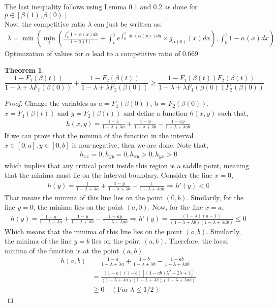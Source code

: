 \documentclass[10pt, letterpaper, twoside]{article}
\newtheorem{theorem}{Theorem}
\begin{document}
	The last inequality follows using Lemma 0.1 and 0.2 as done for $p \in [\beta(1),\beta(0)]$\\
	Now, the competitive ratio $\lambda$ can just be written as:
	\begin{align*}
	\lambda = \min \left(\min_{t}\left(\frac{\int_{0}^{t} 1 - \alpha(x) dx}{1-\alpha(t)} + \int_{t}^{1} e^{\int_{0}^{x} \ln(\alpha(y)) dy} \times g_{\alpha(0)}(x) dx \right), \int_{0}^{1} 1 - \alpha(x) dx \right)
	\end{align*}
	Optimization of values for $\alpha$ lead to a competitive ratio of 0.669\\
	\begin{theorem}
	$$\frac{1-F_{1}(\beta(t))}{1-\lambda+\lambda F_{1}(\beta(0))} + \frac{1-F_{2}(\beta(t))}{1-\lambda+\lambda F_{2}(\beta(0))} \geq \frac{1-F_{1}(\beta(t))F_{2}(\beta(t))}{1-\lambda+\lambda F_{1}(\beta(0))F_{2}(\beta(0))}$$
	\end{theorem}
\begin{proof}
	Change the variables as $a = F_{1}(\beta(0))$, b = $F_{2}(\beta(0))$, $x = F_{1}(\beta(t))$ and $y = F_{2}(\beta(t))$ and define a function $h(x,y)$ such that,
	\begin{align*}
	h(x,y) = \frac{1-x}{1-\lambda+\lambda a} + \frac{1-y}{1-\lambda+\lambda b} - \frac{1-xy}{1-\lambda+\lambda ab}
	\end{align*}
	If we can prove that the minima of the function in the interval $x \in [0,a], y\in [0,b]$ is non-negative, then we are done. Note that,
	\begin{align*}
	h_{xx} = 0, h_{yy} = 0, h_{xy} > 0, h_{yx} > 0
	\end{align*}
	which implies that any critical point inside this region is a saddle point, meaning that the minima must lie on the interval boundary. Consider the line $x=0$,
	\begin{align*}
	h(y) = \frac{1}{1-\lambda+\lambda a} + \frac{1-y}{1-\lambda+\lambda b} - \frac{1}{1-\lambda+\lambda ab} \Rightarrow h'(y) < 0
	\end{align*}
	That means the minima of this line lies on the point $(0,b)$. Similarily, for the line $y = 0$, the minima lies on the point $(a,0)$. Now, for the line $x = a$,
	\begin{align*}
	h(y) = \frac{1-a}{1-\lambda+\lambda a} + \frac{1-y}{1-\lambda+\lambda b} - \frac{1-ay}{1-\lambda+\lambda ab} \Rightarrow h'(y) = \frac{(1 - \lambda)(a-1)}{(1-\lambda+\lambda b)(1-\lambda+\lambda ab)} \leq 0
	\end{align*}
	Which means that the minima of this line lies on the point $(a,b)$. Similarily, the minima of the line $y=b$ lies on the point $(a,b)$. Therefore, the local minima of the function is at the point $(a,b)$.
	\begin{align*}
	h(a,b) &= \frac{1-a}{1-\lambda+\lambda a} + \frac{1-b}{1-\lambda+\lambda b} - \frac{1-ab}{1-\lambda+\lambda ab} \\
	&= \frac{(1-a)(1-b)[(1-ab)\lambda^2 - 2\lambda + 1]}{(1-\lambda+\lambda a)(1-\lambda+\lambda b)(1-\lambda+\lambda ab)}\\
	&\geq 0  \quad (\text{For $\lambda \leq 1/2$})
	\end{align*}
\end{proof}



\end{document}
